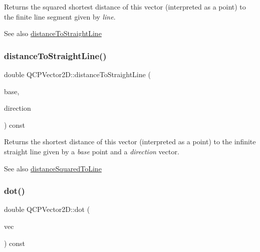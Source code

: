 Returns the squared shortest distance of this vector (interpreted as a point) to the finite line segment given by {\itshape line}.

\begin{DoxySeeAlso}{See also}
\hyperlink{class_q_c_p_vector2_d_ae240b845c3744e43a5d0aa7b2bb66c19}{distance\+To\+Straight\+Line} 
\end{DoxySeeAlso}
\mbox{\label{class_q_c_p_vector2_d_ae240b845c3744e43a5d0aa7b2bb66c19}} 
\subsubsection{\texorpdfstring{distance\+To\+Straight\+Line()}{distanceToStraightLine()}}
{\footnotesize\ttfamily double Q\+C\+P\+Vector2\+D\+::distance\+To\+Straight\+Line (\begin{DoxyParamCaption}\item[{const \hyperlink{class_q_c_p_vector2_d}{Q\+C\+P\+Vector2D} \&}]{base,  }\item[{const \hyperlink{class_q_c_p_vector2_d}{Q\+C\+P\+Vector2D} \&}]{direction }\end{DoxyParamCaption}) const}

Returns the shortest distance of this vector (interpreted as a point) to the infinite straight line given by a {\itshape base} point and a {\itshape direction} vector.

\begin{DoxySeeAlso}{See also}
\hyperlink{class_q_c_p_vector2_d_a14840cd3da80cfee4eb3f8977cab89ab}{distance\+Squared\+To\+Line} 
\end{DoxySeeAlso}
\mbox{\label{class_q_c_p_vector2_d_a39f8d28db7dbffcca6aa63a1f1f6e176}} 
\subsubsection{\texorpdfstring{dot()}{dot()}}
{\footnotesize\ttfamily double Q\+C\+P\+Vector2\+D\+::dot (\begin{DoxyParamCaption}\item[{const \hyperlink{class_q_c_p_vector2_d}{Q\+C\+P\+Vector2D} \&}]{vec }\end{DoxyParamCaption}) const\hspace{0.3cm}{\ttfamily [inline]}}

